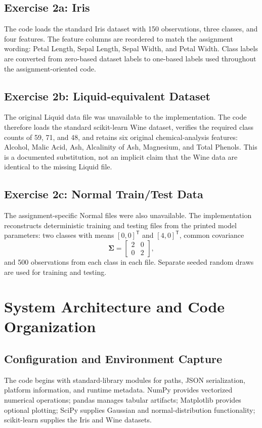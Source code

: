 \documentclass[11pt,a4paper]{article}
\begin{document}
\subsection{Exercise 2a: Iris}
The code loads the standard Iris dataset with 150 observations, three classes, and four features. The feature columns are reordered to match the assignment wording: Petal Length, Sepal Length, Sepal Width, and Petal Width. Class labels are converted from zero-based dataset labels to one-based labels used throughout the assignment-oriented code.

\subsection{Exercise 2b: Liquid-equivalent Dataset}
The original Liquid data file was unavailable to the implementation. The code therefore loads the standard scikit-learn Wine dataset, verifies the required class counts of 59, 71, and 48, and retains six original chemical-analysis features: Alcohol, Malic Acid, Ash, Alcalinity of Ash, Magnesium, and Total Phenols. This is a documented substitution, not an implicit claim that the Wine data are identical to the missing Liquid file.

\subsection{Exercise 2c: Normal Train/Test Data}
The assignment-specific Normal files were also unavailable. The implementation reconstructs deterministic training and testing files from the printed model parameters: two classes with means $[0,0]^{\mathsf T}$ and $[4,0]^{\mathsf T}$, common covariance
\begin{equation}
\boldsymbol{\Sigma}
=
\begin{bmatrix}
2 & 0\\
0 & 2
\end{bmatrix},
\end{equation}
and 500 observations from each class in each file. Separate seeded random draws are used for training and testing.

\section{System Architecture and Code Organization}

\subsection{Configuration and Environment Capture}
The code begins with standard-library modules for paths, JSON serialization, platform information, and runtime metadata. NumPy provides vectorized numerical operations; pandas manages tabular artifacts; Matplotlib provides optional plotting; SciPy supplies Gaussian and normal-distribution functionality; scikit-learn supplies the Iris and Wine datasets.
\end{document}
